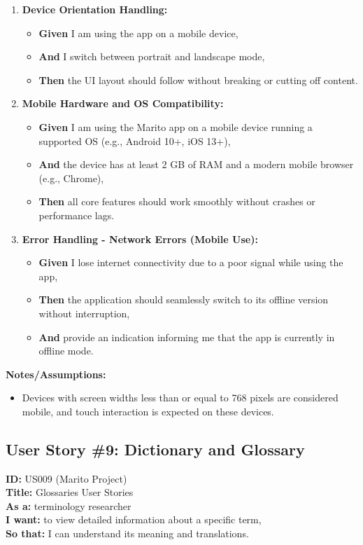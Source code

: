 \documentclass[12pt]{article}
\begin{document}
\begin{enumerate}
    \item \textbf{Device Orientation Handling:}
    \begin{itemize}
        \item \textbf{Given} I am using the app on a mobile device,
        \item \textbf{And} I switch between portrait and landscape mode,
        \item \textbf{Then} the UI layout should follow without breaking or cutting off content.
    \end{itemize}

    \item \textbf{Mobile Hardware and OS Compatibility:}
    \begin{itemize}
        \item \textbf{Given} I am using the Marito app on a mobile device running a supported OS (e.g., Android 10+, iOS 13+),
        \item \textbf{And} the device has at least 2 GB of RAM and a modern mobile browser (e.g., Chrome),
        \item \textbf{Then} all core features should work smoothly without crashes or performance lags.
    \end{itemize}

    \item \textbf{Error Handling - Network Errors (Mobile Use):}
    \begin{itemize}
        \item \textbf{Given} I lose internet connectivity due to a poor signal while using the app,
        \item \textbf{Then} the application should seamlessly switch to its offline version without interruption,
        \item \textbf{And} provide an indication informing me that the app is currently in offline mode.
    \end{itemize}
\end{enumerate}

\vspace{1em}
\textbf{Notes/Assumptions:}
\begin{itemize}
    \item Devices with screen widths less than or equal to 768 pixels are considered mobile, and touch interaction is expected on these devices.
\end{itemize}



\subsection{User Story \#9: Dictionary and Glossary}
\textbf{ID:} US009 (Marito Project) \\
\textbf{Title:} Glossaries User Stories \\
\textbf{As a:}  terminology researcher \\
\textbf{I want:}  to view detailed information about a specific term, \\
\textbf{So that:} I can understand its meaning and translations.
\end{document}
